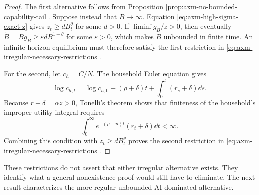 \begin{proof}
The first alternative follows from Proposition
\ref{prop:axm-no-bounded-capability-tail}. Suppose instead that \(B\to\infty\).
Equation \eqref{eq:axm-high-sigma-exact-z} gives
\(z_t\geq dB_t^\theta\) for some \(d>0\). If
\(\liminf g_B/z>0\), then eventually
\(\dot B=B g_B\geq\varepsilon dB^{1+\theta}\) for some
\(\varepsilon>0\), which makes \(B\) unbounded in finite time. An
infinite-horizon equilibrium must therefore satisfy the first restriction in
\eqref{eq:axm-irregular-necessary-restrictions}.

For the second, let \(c_h=C/N\). The household Euler equation gives
\[
 \log c_{h,t}=\log c_{h,0}-(\rho+\delta)t
 +\int_0^t(r_s+\delta)\dd s.
\]
Because \(r+\delta=\alpha z>0\), Tonelli's theorem shows that finiteness of the
household's improper utility integral requires
\[
 \int_0^\infty e^{-(\rho-n)t}(r_t+\delta)\dd t<\infty.
\]
Combining this condition with \(z_t\geq dB_t^\theta\) proves the second
restriction in \eqref{eq:axm-irregular-necessary-restrictions}.
\end{proof}

These restrictions do not assert that either irregular alternative exists.
They identify what a general nonexistence proof would still have to eliminate.
The next result characterizes the more regular unbounded AI-dominated
alternative.

